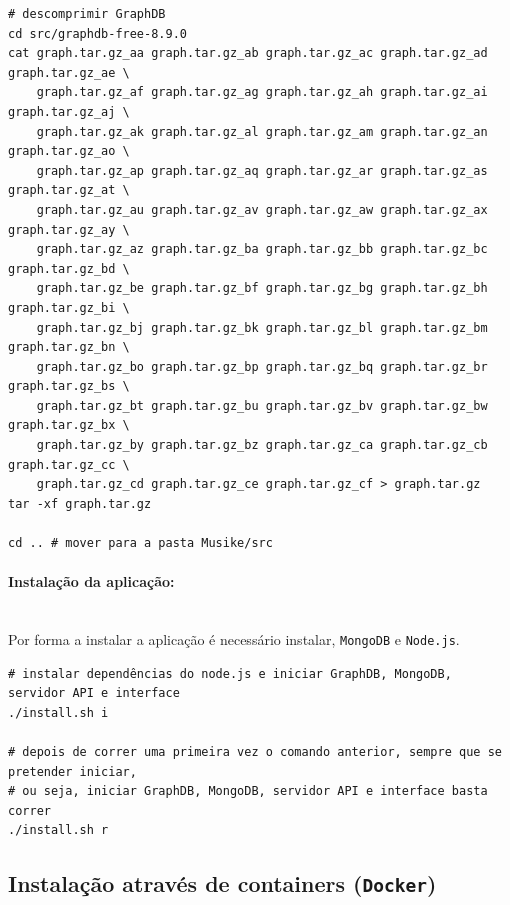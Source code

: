\documentclass{article}
\begin{document}
\begin{framed}
\begin{verbatim}
# descomprimir GraphDB
cd src/graphdb-free-8.9.0
cat graph.tar.gz_aa graph.tar.gz_ab graph.tar.gz_ac graph.tar.gz_ad graph.tar.gz_ae \
    graph.tar.gz_af graph.tar.gz_ag graph.tar.gz_ah graph.tar.gz_ai graph.tar.gz_aj \
    graph.tar.gz_ak graph.tar.gz_al graph.tar.gz_am graph.tar.gz_an graph.tar.gz_ao \
    graph.tar.gz_ap graph.tar.gz_aq graph.tar.gz_ar graph.tar.gz_as graph.tar.gz_at \
    graph.tar.gz_au graph.tar.gz_av graph.tar.gz_aw graph.tar.gz_ax graph.tar.gz_ay \
    graph.tar.gz_az graph.tar.gz_ba graph.tar.gz_bb graph.tar.gz_bc graph.tar.gz_bd \
    graph.tar.gz_be graph.tar.gz_bf graph.tar.gz_bg graph.tar.gz_bh graph.tar.gz_bi \
    graph.tar.gz_bj graph.tar.gz_bk graph.tar.gz_bl graph.tar.gz_bm graph.tar.gz_bn \
    graph.tar.gz_bo graph.tar.gz_bp graph.tar.gz_bq graph.tar.gz_br graph.tar.gz_bs \
    graph.tar.gz_bt graph.tar.gz_bu graph.tar.gz_bv graph.tar.gz_bw graph.tar.gz_bx \
    graph.tar.gz_by graph.tar.gz_bz graph.tar.gz_ca graph.tar.gz_cb graph.tar.gz_cc \
    graph.tar.gz_cd graph.tar.gz_ce graph.tar.gz_cf > graph.tar.gz
tar -xf graph.tar.gz

cd .. # mover para a pasta Musike/src
\end{verbatim}
\end{framed}

\paragraph{Instalação da aplicação:}\mbox{}\\

Por forma a instalar a aplicação é necessário instalar, \texttt{MongoDB} e \texttt{Node.js}.

\begin{framed}
\begin{verbatim}
# instalar dependências do node.js e iniciar GraphDB, MongoDB, servidor API e interface
./install.sh i

# depois de correr uma primeira vez o comando anterior, sempre que se pretender iniciar,
# ou seja, iniciar GraphDB, MongoDB, servidor API e interface basta correr
./install.sh r
\end{verbatim}
\end{framed}

\subsection{Instalação através de containers (\texttt{Docker})}
\end{document}
